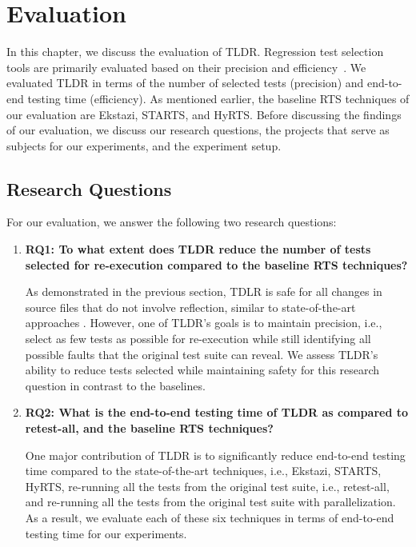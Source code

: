 \chapter{Evaluation}
\label{sec:evaluation}
In this chapter, we discuss the evaluation of TLDR. Regression test selection tools are primarily evaluated based on their precision and efficiency~\cite{ekstazi, hyrts, starts, faulttracer}. We evaluated TLDR in terms of the number of selected tests (precision) and end-to-end testing time (efficiency). As mentioned earlier, the baseline RTS techniques of our evaluation are Ekstazi, STARTS, and HyRTS. Before discussing the findings of our evaluation, we discuss our research questions, the projects that serve as subjects for our experiments, and the experiment setup. 

\section{Research Questions}
For our evaluation, we answer the following two research questions:  
\begin{enumerate}[leftmargin=2mm,itemindent=.5cm,labelwidth=\itemindent,align=left,noitemsep,topsep=0pt]
	\item \textbf{RQ1: To what extent does TLDR reduce the number of tests selected for re-execution compared to the baseline RTS techniques?}
	
	As demonstrated in the previous section, TDLR is safe for all changes in source files that do not involve reflection, similar to state-of-the-art approaches \cite{starts,ekstazi}. However, one of TLDR's goals is to maintain precision, i.e., select as few tests as possible for re-execution while still identifying all possible faults that the original test suite can reveal. We assess TLDR's ability to reduce tests selected while maintaining safety for this research question in contrast to the baselines.
	
	\item \textbf{RQ2: What is the end-to-end testing time of TLDR as compared to retest-all, and the baseline RTS techniques?}
	
	One major contribution of TLDR is to significantly reduce end-to-end testing time compared to the state-of-the-art techniques, i.e., Ekstazi, STARTS, HyRTS, re-running all the tests from the original test suite, i.e., retest-all, and re-running all the tests from the original test suite with parallelization. As a result, we evaluate each of these six techniques in terms of end-to-end testing time for our experiments.
\end{enumerate}

